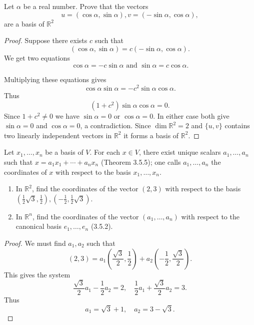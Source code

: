 \begin{tcolorbox}[title=Problem 5, breakable]
    Let $\alpha$ be a real number. Prove that the vectors 
    \[u = (\cos \alpha, \sin \alpha), v = (-\sin \alpha, \cos \alpha),\]
    are a basis of $\mathbb{R}^2$
\end{tcolorbox}

\begin{proof}
    Suppose there exists $c$ such that 
    \[(\cos \alpha, \sin \alpha) = c(-\sin \alpha, \cos \alpha).\]
    We get two equations 
    \[\cos\alpha = -c \sin \alpha \text{ and } \sin \alpha = c \cos \alpha.\]

    Multiplying these equations gives
    \[
    \cos\alpha \sin\alpha = -c^2 \sin\alpha \cos\alpha.
    \]
    Thus
    \[
    (1+c^2)\sin\alpha\cos\alpha = 0.
    \]
    Since $1+c^2 \neq 0$ we have $\sin\alpha =0$ or $\cos\alpha=0$.
    In either case both give $\sin\alpha=0$ and $\cos\alpha=0$,
    a contradiction.
    Since $\dim \mathbb{R}^2 = 2$ and $\{u, v\}$ 
        contains two linearly independent vectors in $\mathbb{R}^2$ it forms a basis of $\mathbb{R}^2$.
\end{proof}


\begin{tcolorbox}[title=Problem 7, breakable]
    Let $x_1, \ldots, x_n$ be a basis of $V$.
    For each $x \in V$, there exist unique scalars 
    $a_1, \ldots, a_n$ such that $x = a_1 x_1 + \cdots + a_n x_n$
    (Theorem 3.5.5); one calls $a_1, \ldots, a_n$ the 
    coordinates of $x$ with respect to the basis 
    $x_1, \ldots, x_n$.
    \begin{enumerate}
        \item In $\mathbb{R}^2$, find the coordinates of the vector $(2, 3)$ with respect to the basis $(\frac{1}{2} \sqrt{3}, \frac{1}{2}), (-\frac{1}{2}, \frac{1}{2} \sqrt{3})$.
        \item In $\mathbb{R}^n$, find the coordinates of the vector $(a_1, \ldots, a_n)$ with respect to the canonical basis $e_1, \ldots, e_n$ (3.5.2).
    \end{enumerate}
\end{tcolorbox}

\begin{proof}
    We must find $a_1, a_2$ such that 
    \[(2, 3) = a_1 \left(\frac{\sqrt{3}}{2}, \frac{1}{2}\right) + a_2 \left(-\frac{1}{2}, \frac{\sqrt{3}}{2}\right).\]
    This gives the system
    \[
    \frac{\sqrt{3}}{2}a_1 - \frac{1}{2}a_2 = 2, \quad \frac{1}{2}a_1 + \frac{\sqrt{3}}{2}a_2 = 3.
    \]
    Thus
    \[
    a_1 = \sqrt{3} + 1, \quad a_2 = 3 - \sqrt{3}.
    \]
\end{proof}

